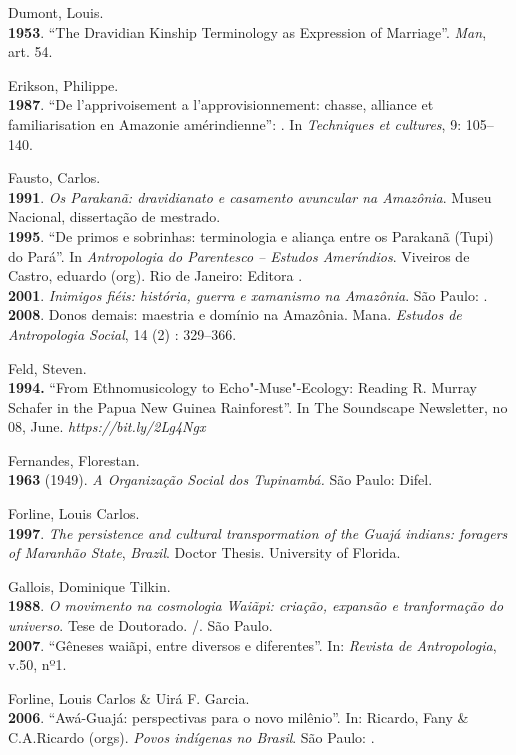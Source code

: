 \begin{Parskip}
Dumont, Louis.\\
\textbf{1953}. ``The Dravidian Kinship Terminology as Expression of
Marriage''. \emph{Man}, art. 54.

Erikson, Philippe.\\
\textbf{1987}. ``De l'apprivoisement a l'approvisionnement: chasse,
alliance et familiarisation en Amazonie amérindienne'': . In
\emph{Techniques et cultures}, 9: 105--140.

Fausto, Carlos.\\
\textbf{1991}. \emph{Os Parakanã: dravidianato e casamento avuncular na
Amazônia}. Museu Nacional, dissertação de mestrado.\\
\textbf{1995}. ``De primos e sobrinhas: terminologia e aliança entre os
Parakanã (Tupi) do Pará''. In \emph{Antropologia do Parentesco -- Estudos
Ameríndios}. Viveiros de Castro, eduardo (org). Rio de Janeiro: Editora
.\\
\textbf{2001}. \emph{Inimigos fiéis: história, guerra e xamanismo na
Amazônia}. São Paulo: .\\
\textbf{2008}. Donos demais: maestria e domínio na Amazônia. Mana.
\emph{Estudos de Antropologia Social}, 14 (2) : 329--366.

Feld, Steven.\\
\textbf{1994.} ``From Ethnomusicology to Echo"-Muse"-Ecology: Reading R.
Murray Schafer in the Papua New Guinea Rainforest''. In The Soundscape
Newsletter, no 08, June.
\emph{https://bit.ly/2Lg4Ngx}

Fernandes, Florestan.\\
\textbf{1963} (1949). \emph{A Organização Social dos Tupinambá.} São
Paulo: Difel.

Forline, Louis Carlos.\\
\textbf{1997}. \emph{The persistence and cultural transpormation of the
Guajá indians: foragers of Maranhão State}, \emph{Brazil}. Doctor
Thesis. University of Florida.

Gallois, Dominique Tilkin.\\
\textbf{1988}. \emph{O movimento na cosmologia Waiãpi: criação, expansão
e tranformação do universo}. Tese de Doutorado. /. São Paulo.\\
\textbf{2007}. ``Gêneses waiãpi, entre diversos e diferentes''. In:
\emph{Revista de Antropologia}, v.50, nº1.

Forline, Louis Carlos \& Uirá F. Garcia.\\
\textbf{2006}. ``Awá-Guajá: perspectivas para o novo milênio''. In:
Ricardo, Fany \& C.A.Ricardo (orgs). \emph{Povos indígenas no Brasil}.
São Paulo: .


\end{Parskip}
